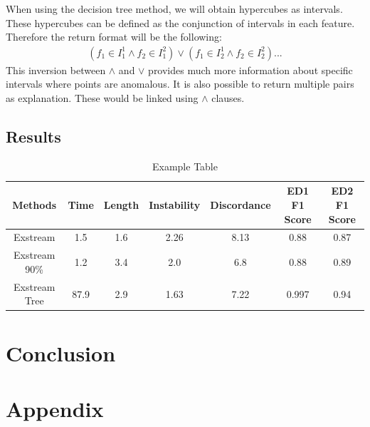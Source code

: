 \documentclass[oneside, a4paper, onecolumn, 11pt]{article}
\begin{document}
When using the decision tree method, we will obtain hypercubes as intervals. These hypercubes can be defined as the conjunction of intervals in each feature. Therefore the return format will be the following: 
\begin{align*}
  (f_1 \in I^1_1 \land f_2 \in I^2_1) \lor (f_1 \in I^1_2 \land f_2 \in I^2_2) ...
\end{align*}
This inversion between $\land$ and $\lor$ provides much more information about specific intervals where points are anomalous. It is also possible to return multiple pairs as explanation. These would be linked using $\land$ clauses.
\subsection{Results}
\begin{table}[h]
  \centering
  \begin{tabular}{|c|c|c|c|c|c|c|}
      \hline
      Methods & Time & Length & Instability & Discordance & ED1 F1 Score & ED2 F1 Score\\ 
      \hline
      Exstream  & 1.5  & 1.6  & 2.26  & 8.13 & 0.88 & 0.87  \\ 
      Exstream 90\%  & 1.2  & 3.4  & 2.0  & 6.8 & 0.88 & 0.89\\ 
      Exstream Tree  & 87.9  & 2.9  & 1.63 & 7.22 & 0.997 & 0.94 \\ 
      \hline
  \end{tabular}
  \caption{Example Table}
  \label{tab:example}
\end{table}


\section{Conclusion}

\newpage



\newpage
\appendix

\section{Appendix}
\label{sec:appendix}
\end{document}
